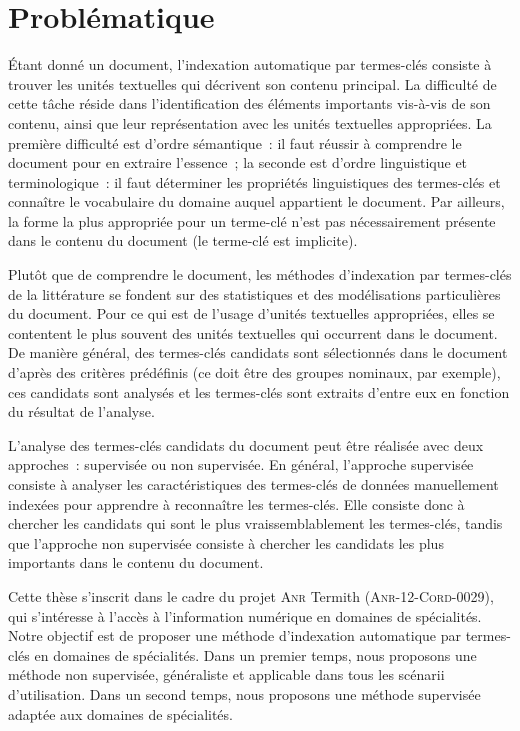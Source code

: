 
  \section{Problématique}
  \label{sec:main-introduction-problem_statement}
    Étant donné un document, l'indexation automatique par termes-clés consiste à
    trouver les unités textuelles qui décrivent son contenu principal. La
    difficulté de cette tâche réside dans l'identification des éléments
    importants vis-à-vis de son contenu, ainsi que leur représentation avec les
    unités textuelles appropriées. La première difficulté est d'ordre
    sémantique~: il faut réussir à comprendre le document pour en extraire
    l'essence~; la seconde est d'ordre linguistique et terminologique~: il faut
    déterminer les propriétés linguistiques des termes-clés et connaître le
    vocabulaire du domaine auquel appartient le document. Par ailleurs, la forme
    la plus appropriée pour un terme-clé n'est pas nécessairement présente
    dans le contenu du document (le terme-clé est implicite).

    Plutôt que de comprendre le document, les méthodes d'indexation par
    termes-clés de la littérature se fondent sur des statistiques et
    des modélisations particulières du document. Pour ce qui est de l'usage
    d'unités textuelles appropriées, elles se contentent le plus souvent des
    unités textuelles qui occurrent dans le document. De manière général, des
    termes-clés candidats sont sélectionnés dans le document d'après des
    critères prédéfinis (ce doit être des groupes nominaux, par exemple), ces
    candidats sont analysés et les termes-clés sont extraits d'entre eux en
    fonction du résultat de l'analyse.

    L'analyse des termes-clés candidats du document peut être réalisée avec deux
    approches~: supervisée ou non supervisée. En général, l'approche supervisée
    consiste à analyser les caractéristiques des termes-clés de données
    manuellement indexées pour apprendre à reconnaître les termes-clés. Elle
    consiste donc à chercher les candidats qui sont le plus vraissemblablement
    les termes-clés, tandis que l'approche non supervisée consiste à chercher
    les candidats les plus importants dans le contenu du document.

    Cette thèse s'inscrit dans le cadre du projet \textsc{Anr} Termith
    (\textsc{Anr-12-Cord-0029}), qui s'intéresse à l'accès à l'information
    numérique en domaines de spécialités. Notre objectif est de proposer une
    méthode d'indexation automatique par termes-clés en domaines de spécialités.
    Dans un premier temps, nous proposons une méthode non supervisée,
    généraliste et applicable dans tous les scénarii d'utilisation. Dans un
    second temps, nous proposons une méthode supervisée adaptée aux domaines de
    spécialités.

